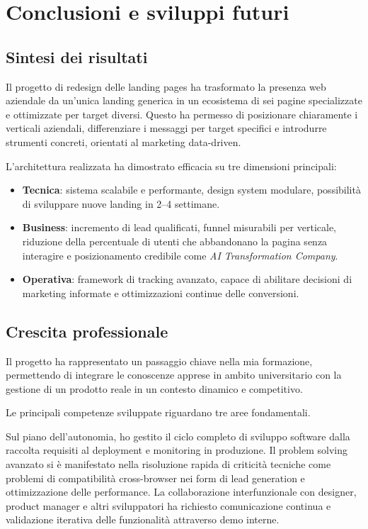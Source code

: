 \chapter{Conclusioni e sviluppi futuri}

\section{Sintesi dei risultati}
Il progetto di redesign delle landing pages ha trasformato la presenza web aziendale 
da un'unica landing generica in un ecosistema di sei pagine specializzate e 
ottimizzate per target diversi. Questo ha permesso di posizionare chiaramente i 
verticali aziendali, differenziare i messaggi per target specifici e introdurre 
strumenti concreti, orientati al marketing data-driven.

L'architettura realizzata ha dimostrato efficacia su tre dimensioni principali:
\begin{itemize}
  \item \textbf{Tecnica}: sistema scalabile e performante, design system modulare, 
        possibilità di sviluppare nuove landing in 2--4 settimane.
  \item \textbf{Business}: incremento di lead qualificati, funnel misurabili per verticale,
        riduzione della percentuale di utenti che abbandonano la pagina senza interagire 
        e posizionamento credibile come \textit{AI Transformation Company}.
  \item \textbf{Operativa}: framework di tracking avanzato, capace di abilitare decisioni di marketing informate
        e ottimizzazioni continue delle conversioni.
\end{itemize}

\section{Crescita professionale}
Il progetto ha rappresentato un passaggio chiave nella mia formazione,
permettendo di integrare le conoscenze apprese in ambito universitario con la gestione
di un prodotto reale in un contesto dinamico e competitivo.

\medskip
Le principali competenze sviluppate riguardano tre aree fondamentali. 

Sul piano 
dell'autonomia, ho gestito il ciclo completo di sviluppo software dalla raccolta 
requisiti al deployment e monitoring in produzione. Il problem solving avanzato 
si è manifestato nella risoluzione rapida di criticità tecniche come problemi di 
compatibilità cross-browser nei form di lead generation e ottimizzazione delle 
performance. La collaborazione interfunzionale con designer, product manager e 
altri sviluppatori ha richiesto comunicazione continua e validazione iterativa 
delle funzionalità attraverso demo interne.

